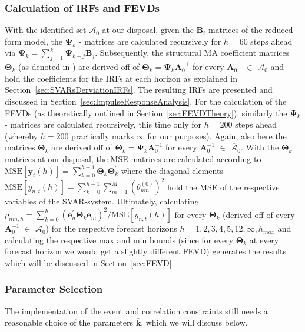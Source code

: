 \documentclass[a4paper,11pt,listof=nochaptergap,oneside,pointednumbers,bibtotoc,bigheadings,liststotoc,hidelinks]{scrbook}
\theoremstyle{mysatz}
\theoremstyle{mydefinition}
\theoremstyle{mytheorem}
\theoremstyle{mybemerkung}
\newcommand{\vect}[1]{\boldsymbol{\mathbf{#1}}}
\begin{document}
\subsubsection{Calculation of IRFs and FEVDs}
With the identified set $\overline{\vect{\mathcal{A}}}_0$ at our disposal, given the $\vect{B}_i$-matrices of the reduced-form model, the $\vect{\Psi}_k$ - matrices are calculated recursively for $h=60$ steps ahead via $\vect{\Psi}_k = \sum\limits_{j=1}^k \vect{\Psi}_{k-j}\vect{B}_j$. Subsequently, the structural MA coefficient matrices $\vect{\Theta}_k$ (as denoted in \citet{lutkepohlkilian:17}) are derived off of $\vect{\Theta}_k = \vect{\Psi}_k\vect{A}_0^{-1}$ for every $\vect{A}_0^{-1}$ $\in$ $\overline{\vect{\mathcal{A}}}_0$ and hold the coefficients for the IRFs at each horizon as explained in Section~\ref{sec:SVARsDerviationIRFs}. The resulting IRFs are presented and discussed in Section~\ref{sec:ImpulseResponseAnalysis}. For the calculation of the FEVDs (as theoretically outlined in Section~\ref{sec:FEVDTheory}), similarly the $\vect{\Psi}_k$ - matrices are calculated recursively, this time only for $h=200$ steps ahead (whereby $h=200$ practically marks $\infty$ for our purposes). Again, also here the matrices $\vect{\Theta}_k$ are derived off of $\vect{\Theta}_k = \vect{\Psi}_k\vect{A}_0^{-1}$ for every $\vect{A}_0^{-1}$ $\in$ $\overline{\vect{\mathcal{A}}}_0$. With the $\vect{\Theta}_k$ matrices at our disposal, the MSE matrices are calculated according to $\text{MSE}[\vect{y}_t(h)] = \sum\limits_{k=0}^{h-1} \vect{\Theta}_k\vect{\Theta}_k^'$ where the diagonal elements $\text{MSE}[y_{n,t}(h)] = \sum\limits_{k=0}^{h-1}\sum\limits_{m=1}^{M}\left(\theta_{nm}^{(0)}\right)^2$ hold the MSE of the respective variables of the SVAR-system. Ultimately, calculating $\rho_{nm,h} = \sum\limits_{k=0}^{h-1} (\vect{e}_n^'\vect{\Theta}_k\vect{e}_m)^2 / \text{MSE}[y_{n,t}(h)]$ for every $\vect{\Theta}_k$ (derived off of every $\vect{A}_0^{-1}$ $\in$ $\overline{\vect{\mathcal{A}}}_0$) for the respective forecast horizons $h=1, 2, 3, 4, 5, 12, \infty, h_{max}$ and calculating the respective max and min bounds (since for every $\vect{\Theta}_k$ at every forecast horizon we would get a slightly different FEVD) generates the results which will be discussed in Section~\ref{sec:FEVD}.

\subsubsection{Parameter Selection}
The implementation of the event and correlation constraints still needs a reasonable choice of the parameters $\overline{\vect{k}}$, which we will discuss below.
\end{document}
